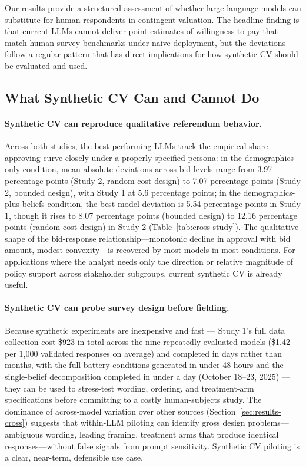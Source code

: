 \documentclass[12pt]{article}
\begin{document}
Our results provide a structured assessment of whether large language
models can substitute for human respondents in contingent valuation. The
headline finding is that current LLMs cannot deliver point estimates of
willingness to pay that match human-survey benchmarks under naive
deployment, but the deviations follow a regular pattern that has direct
implications for how synthetic CV should be evaluated and used.

\subsection{What Synthetic CV Can and Cannot Do}\label{sec:disc-can-cant}

\paragraph{Synthetic CV can reproduce qualitative referendum behavior.}
Across both studies, the best-performing LLMs track the empirical
share-approving curve closely under a properly specified persona: in the demographics-only condition, mean absolute deviations across bid levels range from 3.97 percentage points (Study 2, random-cost design) to 7.07
percentage points (Study 2, bounded design), with Study 1 at 5.6 percentage points; in the demographics-plus-beliefs condition, the
best-model deviation is 5.54 percentage points in Study 1, though it rises to 8.07 percentage points (bounded design) to 12.16 percentage points (random-cost design) in Study 2 (Table~\ref{tab:cross-study}). The qualitative shape of the bid-response relationship---monotonic decline in approval with bid amount, modest convexity---is recovered by most models
in most conditions. For applications where the analyst needs only the direction or relative magnitude of policy support across stakeholder
subgroups, current synthetic CV is already useful.

\paragraph{Synthetic CV can probe survey design before fielding.} Because
synthetic experiments are inexpensive and fast --- Study 1's full data
collection cost \$923 in total across the nine repeatedly-evaluated models
(\$1.42 per 1{,}000 validated responses on average) and completed in days
rather than months, with the full-battery conditions generated in under 48
hours and the single-belief decomposition completed in under a day
(October 18--23, 2025) --- they can be used to stress-test wording,
ordering, and treatment-arm specifications before committing to a costly
human-subjects study. The dominance of across-model variation over other
sources (Section~\ref{sec:results-cross}) suggests that within-LLM
piloting can identify gross design problems---ambiguous wording, leading
framing, treatment arms that produce identical responses---without false
signals from prompt sensitivity. Synthetic CV piloting is a clear,
near-term, defensible use case.
\end{document}
